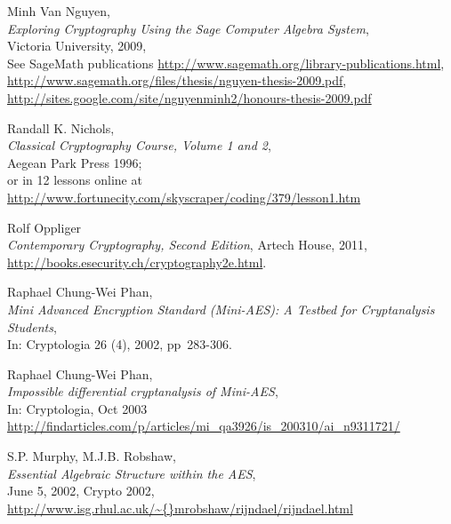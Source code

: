 \begin{thebibliography}{99999}
  
       Minh Van Nguyen, \\
       {\em Exploring Cryptography Using the Sage Computer Algebra System}, \\
       Victoria University, 2009, \\
       See SageMath publications \url{http://www.sagemath.org/library-publications.html},\\
       \url{http://www.sagemath.org/files/thesis/nguyen-thesis-2009.pdf},\\
       \url{http://sites.google.com/site/nguyenminh2/honours-thesis-2009.pdf}

  
       Randall K. Nichols, \\
       {\em Classical Cryptography Course, Volume 1 and 2}, \\
       Aegean Park Press 1996;\\
       or in 12 lessons online at \\
       \url{http://www.fortunecity.com/skyscraper/coding/379/lesson1.htm}

 
       Rolf Oppliger \\
       {\em Contemporary Cryptography, Second Edition},
       Artech House, 2011, \\
       \url{http://books.esecurity.ch/cryptography2e.html}.

  
       Raphael Chung-Wei Phan, \\
       {\em Mini Advanced Encryption Standard (Mini-AES): A Testbed for
            Cryptanalysis Students}, \\
       In: Cryptologia 26 (4), 2002, pp~283-306.

  
       Raphael Chung-Wei Phan, \\
       {\em Impossible differential cryptanalysis of Mini-AES}, \\
       In: Cryptologia, Oct 2003\\
       \url{http://findarticles.com/p/articles/mi_qa3926/is_200310/ai_n9311721/}

  
       S.P. Murphy, M.J.B. Robshaw, \\
       {\em Essential Algebraic Structure within the AES}, \\
       June 5, 2002, Crypto 2002,  \\
       \url{http://www.isg.rhul.ac.uk/\~{}mrobshaw/rijndael/rijndael.html}


\end{thebibliography}

